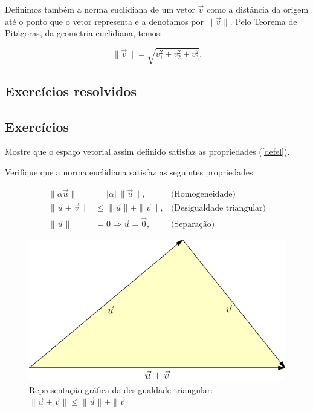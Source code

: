 Definimos também a norma euclidiana de um vetor $\vec{v}$ como a distância da origem até o ponto que o vetor representa e a denotamos por $\|\vec{v}\|$. Pelo Teorema de Pitágoras, da geometria euclidiana, temos:


\begin{equation}\label{defnorma}\|\vec{v}\|=\sqrt{v_1^2+v_2^2+v_3^2}.\end{equation}

\subsection*{Exercícios resolvidos}

\construirExeresol

\subsection*{Exercícios}

\begin{exer} Mostre que o espaço vetorial assim definido satisfaz as propriedades (\ref{defel}).
\end{exer}

\begin{exer}\label{exnorma}Verifique que a norma euclidiana satisfaz as seguintes propriedades:
  
\begin{subequations}\label{propnorma}
\begin{align}
\|\alpha \vec{u}\|&=|\alpha|~\!\|\vec{u}\|,&\text{(Homogeneidade)}\label{propnormahom}\\
\|\vec{u}+\vec{v}\|&\leq \|\vec{u}\|+\|\vec{v}\|,&\text{(Desigualdade triangular)}\label{propnormatri}\\
\|\vec{u}\|&=0 \Longrightarrow \vec{u}=\vec{0},&\text{(Separação)}\label{propnormasep}
\end{align}
\end{subequations}
\end{exer}

\begin{figure}%
\begin{center}
 \includegraphics{./cap_algvet/figs/desigualdade_triangulo}
      \caption{Representação gráfica da desigualdade triangular: $\|\vec{u}+\vec{v}\|\leq \|\vec{u}\|+\|\vec{v}\|$}
      \label{fig:des_triang}
      \end{center}
   \end{figure}

